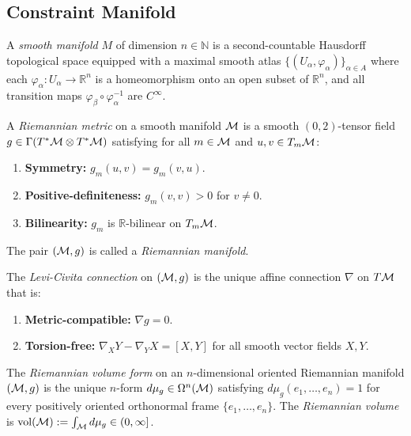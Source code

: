 \subsection{Constraint Manifold}
\label{sec:ch3:constraint}

\begin{definition}
\label{def:3.3}
A \emph{smooth manifold} $M$ of dimension $n \in \mathbb{N}$ is a
second-countable Hausdorff topological space equipped with a maximal
smooth atlas $\{(U_\alpha, \varphi_\alpha)\}_{\alpha \in A}$ where each
$\varphi_\alpha : U_\alpha \to \mathbb{R}^n$ is a homeomorphism onto an
open subset of $\mathbb{R}^n$, and all transition maps
$\varphi_\beta \circ \varphi_\alpha^{-1}$ are $C^\infty$.
\end{definition}

\begin{definition}
\label{def:3.4}
A \emph{Riemannian metric} on a smooth manifold $\mathcal{M}$ is a smooth
$(0,2)$-tensor field $g \in \Gamma(T^*\mathcal{M} \otimes T^*\mathcal{M})$ satisfying
for all $m \in \mathcal{M}$ and $u, v \in T_m\mathcal{M}$:
\begin{enumerate}
  \item[(R1)] \textbf{Symmetry:} $g_m(u, v) = g_m(v, u)$.
  \item[(R2)] \textbf{Positive-definiteness:} $g_m(v, v) > 0$ for
    $v \neq 0$.
  \item[(R3)] \textbf{Bilinearity:} $g_m$ is $\mathbb{R}$-bilinear on
    $T_m\mathcal{M}$.
\end{enumerate}
The pair $(\mathcal{M}, g)$ is called a \emph{Riemannian manifold}.
\end{definition}

\begin{definition}
\label{def:3.5}
The \emph{Levi-Civita connection} on $(\mathcal{M}, g)$ is the unique affine
connection $\nabla$ on $T\mathcal{M}$ that is:
\begin{enumerate}
  \item[(LC1)] \textbf{Metric-compatible:} $\nabla g = 0$.
  \item[(LC2)] \textbf{Torsion-free:} $\nabla_X Y - \nabla_Y X = [X,Y]$
    for all smooth vector fields $X, Y$.
\end{enumerate}
\end{definition}

\begin{definition}
\label{def:3.6}
The \emph{Riemannian volume form} on an $n$-dimensional oriented
Riemannian manifold $(\mathcal{M}, g)$ is the unique $n$-form
$d\mu_g \in \Omega^n(\mathcal{M})$ satisfying
$d\mu_g(e_1, \ldots, e_n) = 1$ for every positively oriented
orthonormal frame $\{e_1, \ldots, e_n\}$.  The \emph{Riemannian volume}
is $\mathrm{vol}(\mathcal{M}) := \int_{\mathcal{M}} d\mu_g \in (0, \infty]$.
\end{definition}

